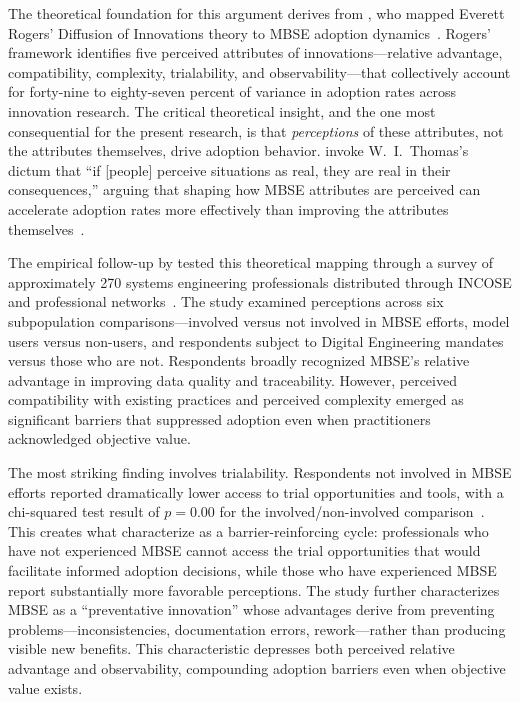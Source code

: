 The theoretical foundation for this argument derives from \citeauthor{Call_Herber_2022}, who mapped Everett Rogers' Diffusion of Innovations theory to MBSE adoption dynamics~\parencite{Call_Herber_2022}. Rogers' framework identifies five perceived attributes of innovations---relative advantage, compatibility, complexity, trialability, and observability---that collectively account for forty-nine to eighty-seven percent of variance in adoption rates across innovation research. The critical theoretical insight, and the one most consequential for the present research, is that \textit{perceptions} of these attributes, not the attributes themselves, drive adoption behavior. \citeauthor{Call_Herber_2022} invoke W.~I.~Thomas's dictum that ``if [people] perceive situations as real, they are real in their consequences,'' arguing that shaping how MBSE attributes are perceived can accelerate adoption rates more effectively than improving the attributes themselves~\parencite{Call_Herber_2022}.

The empirical follow-up by \citeauthor{Call_2024} tested this theoretical mapping through a survey of approximately 270 systems engineering professionals distributed through INCOSE and professional networks~\parencite{Call_2024}. The study examined perceptions across six subpopulation comparisons---involved versus not involved in MBSE efforts, model users versus non-users, and respondents subject to Digital Engineering mandates versus those who are not. Respondents broadly recognized MBSE's relative advantage in improving data quality and traceability. However, perceived compatibility with existing practices and perceived complexity emerged as significant barriers that suppressed adoption even when practitioners acknowledged objective value.

The most striking finding involves trialability. Respondents not involved in MBSE efforts reported dramatically lower access to trial opportunities and tools, with a chi-squared test result of \(p=0.00\) for the involved/non-involved comparison~\parencite{Call_2024}. This creates what \citeauthor{Call_2024} characterize as a barrier-reinforcing cycle: professionals who have not experienced MBSE cannot access the trial opportunities that would facilitate informed adoption decisions, while those who have experienced MBSE report substantially more favorable perceptions. The study further characterizes MBSE as a ``preventative innovation'' whose advantages derive from preventing problems---inconsistencies, documentation errors, rework---rather than producing visible new benefits. This characteristic depresses both perceived relative advantage and observability, compounding adoption barriers even when objective value exists.

